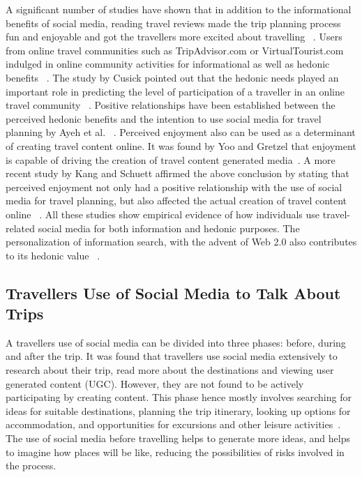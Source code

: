 A significant number of studies have shown that in addition to the informational benefits of social media, reading travel reviews made the trip planning process fun and enjoyable and got the travellers more excited about travelling ~\cite{10.1007/978-3-211-77280-5_4, gretzel2007online, parra2012travellers}. Users from online travel communities such as TripAdvisor.com or VirtualTourist.com indulged in online community activities for informational as well as hedonic benefits ~\cite{chung2008web}. The study by Cusick pointed out that the hedonic needs played an important role in predicting the level of participation of a traveller in an online travel community ~\cite{doi:10.1177/0047287503258824}. Positive relationships have been established between the perceived hedonic benefits and the intention to use social media for travel planning by Ayeh et al. ~\cite{ayeh2013predicting}.  Perceived enjoyment also can be used as a determinant of creating travel content online. It was found by Yoo and Gretzel that enjoyment is capable of driving the creation of travel content generated media~\cite{YOO2011609}. A more recent study by Kang and Schuett affirmed the above conclusion by stating that perceived enjoyment not only had a positive relationship with the use of social media for travel planning, but also affected the actual creation of travel content online ~\cite{doi:10.1080/10548408.2013.751237}.
All these studies show empirical evidence of how individuals use travel-related social media for both information and hedonic purposes. The personalization of information search, with the advent of Web 2.0 also contributes to its hedonic value ~\cite{doi:10.1080/14616688.2012.762542}.

\subsection{Traveller\textquotesingle s Use of Social Media to Talk About Trips}\label{2.2}

A traveller\textquotesingle s use of social media can be divided into three phases: before, during and after the trip. It was found that travellers use social media extensively to research about their trip, read more about the destinations and viewing user generated content (UGC). However, they are not found to be actively participating by creating content. This phase hence mostly involves searching for ideas for suitable destinations, planning the trip itinerary, looking up options for accommodation, and opportunities for excursions and other leisure activities~\cite{cox2009role, fotis2012social}. The use of social media before travelling helps to generate more ideas, and helps to imagine how places will be like, reducing the possibilities of risks involved in the process.

